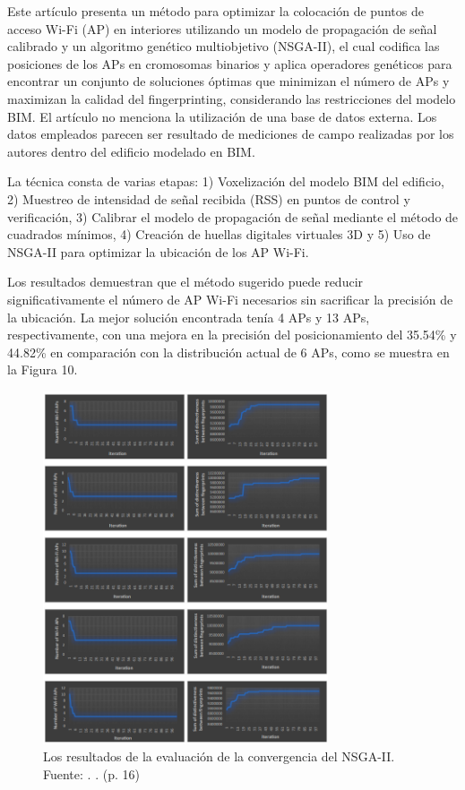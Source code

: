 Este artículo presenta un método para optimizar la colocación de puntos de acceso Wi-Fi (AP) en interiores utilizando un modelo de propagación de señal calibrado y un algoritmo genético multiobjetivo (NSGA-II), el cual codifica las posiciones de los APs en cromosomas binarios y aplica operadores genéticos para encontrar un conjunto de soluciones óptimas que minimizan el número de APs y maximizan la calidad del fingerprinting, considerando las restricciones del modelo BIM. El artículo no menciona la utilización de una base de datos externa. Los datos empleados parecen ser resultado de mediciones de campo realizadas por los autores dentro del edificio modelado en BIM.

La técnica consta de varias etapas: 1) Voxelización del modelo BIM del edificio, 2) Muestreo de intensidad de señal recibida (RSS) en puntos de control y verificación, 3) Calibrar el modelo de propagación de señal mediante el método de cuadrados mínimos, 4) Creación de huellas digitales virtuales 3D y 5) Uso de NSGA-II para optimizar la ubicación de los AP Wi-Fi. 

Los resultados demuestran que el método sugerido puede reducir significativamente el número de AP Wi-Fi necesarios sin sacrificar la precisión de la ubicación. La mejor solución encontrada tenía 4 APs y 13 APs, respectivamente, con una mejora en la precisión del posicionamiento del 35.54\% y 44.82\% en comparación con la distribución actual de 6 APs, como se muestra en la Figura 10.

\begin{figure}[!ht]
	\begin{center}
		\includegraphics[width=0.75\textwidth]{2/figures/hosseini2023.png}
		\caption[Los resultados de la evaluación de la convergencia del NSGA-II]{Los resultados de la evaluación de la convergencia del NSGA-II.\\
		Fuente: \cite{pr_hosseini2023NSGAIIap}. . (p. 16)}
		\label{2:fig118}
	\end{center}
\end{figure}

